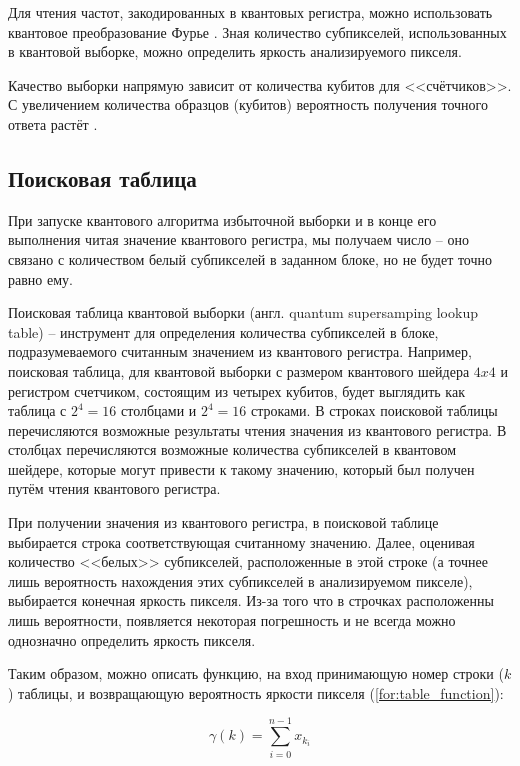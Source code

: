 Для чтения частот, закодированных в квантовых регистра, можно использовать квантовое преобразование Фурье \cite{PQC-fourier}. Зная количество субпикселей, использованных в квантовой выборке, можно определить яркость анализируемого пикселя.

Качество выборки напрямую зависит от количества кубитов для <<счётчиков>>. С увеличением количества образцов (кубитов) вероятность получения точного ответа растёт \cite{PQC-qbits}.

\subsection{Поисковая таблица}\label{table-q}

При запуске квантового алгоритма избыточной выборки и в конце его выполнения читая значение квантового регистра, мы получаем число -- оно связано с количеством белый субпикселей в заданном блоке, но не будет точно равно ему. 

Поисковая таблица квантовой выборки (англ. quantum supersamping lookup table) -- инструмент для определения количества субпикселей в блоке, подразумеваемого считанным значением из квантового регистра. Например, поисковая таблица, для квантовой выборки с размером квантового шейдера $4x4$ и регистром счетчиком, состоящим из четырех кубитов, будет выглядить как таблица с $2^4 = 16$ столбцами и $2^4 = 16$ строками. В строках поисковой таблицы перечисляются возможные результаты чтения значения из квантового регистра. В столбцах перечисляются возможные количества  субпикселей в квантовом шейдере, которые могут привести к такому значению, который был получен путём чтения квантового регистра.

При получении значения из квантового регистра, в поисковой таблице выбирается строка соответствующая считанному значению. Далее, оценивая количество <<белых>> субпикселей, расположенные в этой строке (а точнее лишь вероятность нахождения этих субпикселей в анализируемом пикселе), выбирается конечная яркость пикселя. Из-за того что в строчках расположенны лишь вероятности, появляется некоторая погрешность и не всегда можно  однозначно определить яркость пикселя.

Таким образом, можно описать функцию, на вход принимающую номер строки ($k$) таблицы, и возвращающую вероятность яркости пикселя (\ref{for:table_function}):

\begin{equation}
	\label{for:table_function}
	\gamma(k) = \sum_{i=0}^{n - 1} x_{k_i}
\end{equation}


